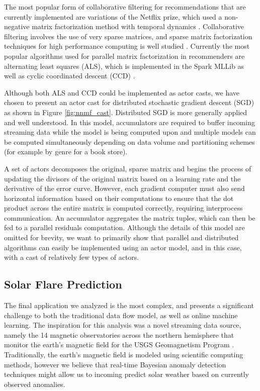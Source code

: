 \documentclass[conference,twocolumn,10pt]{IEEEtran}
\begin{document}
The most popular form of collaborative filtering for recommendations that are currently implemented are variations of the Netflix prize, which used a non-negative matrix factorization method with temporal dynamics \cite{koren_collaborative_2010}. Collaborative filtering involves the use of very sparse matrices, and sparse matrix factorization techniques for high performance computing is well studied \cite{gupta_highly_1997}. Currently the most popular algorithms used for parallel matrix factorization in recommenders are alternating least squares (ALS), which is implemented in the Spark MLLib as well as cyclic coordinated descent (CCD) \cite{yu_scalable_2012}.

Although both ALS and CCD could be implemented as actor casts, we have chosen to present an actor cast for distributed stochastic gradient descent (SGD) \cite{gemulla_large-scale_2011} as shown in Figure \ref{fig:nnmf_cast}. Distributed SGD is more generally applied and well understood. In this model, accumulators are required to buffer incoming streaming data while the model is being computed upon and multiple models can be computed simultaneously depending on data volume and partitioning schemes (for example by genre for a book store).

A set of actors decomposes the original, sparse matrix and begins the process of updating the divisors of the original matrix based on a learning rate and the derivative of the error curve. However, each gradient computer must also send horizontal information based on their computations to ensure that the dot product across the entire matrix is computed correctly, requiring interprocess communication. An accumulator aggregates the matrix tuples, which can then be fed to a parallel residuals computation. Although the details of this model are omitted for brevity, we want to primarily show that parallel and distributed algorithms can easily be implemented using an actor model, and in this case, with a cast of relatively few types of actors.

\subsection{Solar Flare Prediction}

The final application we analyzed is the most complex, and presents a significant challenge to both the traditional data flow model, as well as online machine learning. The inspiration for this analysis was a novel streaming data source, namely the 14 magnetic observatories across the northern hemisphere that monitor the earth's magnetic field for the USGS Geomagnetism Program \cite{love_usgs_2011}. Traditionally, the earth's magnetic field is modeled using scientific computing methods, however we believe that real-time Bayesian anomaly detection techniques \cite{hill_real-time_2007} might allow us to incoming predict solar weather based on currently observed anomalies.
\end{document}

